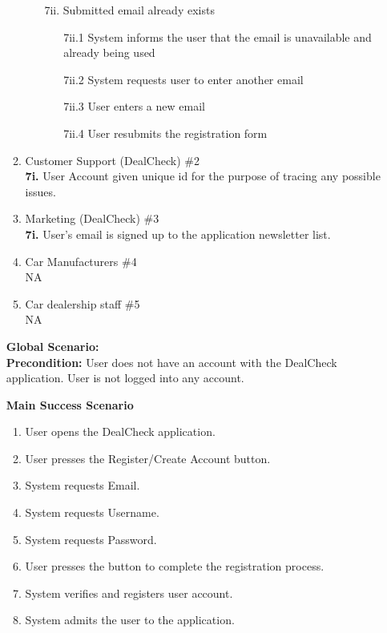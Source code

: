 \documentclass[]{article}
\begin{document}
\begin{enumerate}[{\bf {BE}1.}]
\begin{enumerate}[{\bf VP1.}]
\begin{enumerate}
		\item [7ii.] Submitted email already exists
		\begin{enumerate}
			\item [7ii.1] System informs the user that the email is unavailable and already being used
			\item [7ii.2] System requests user to enter another email
			\item [7ii.3] User enters a new email
			\item [7ii.4] User resubmits the registration form
		\end{enumerate}
	\end{enumerate}

    \item Customer Support (DealCheck) \#2 \\
        \textbf{7i.} User Account given unique id for the purpose of tracing any possible issues.
    \item Marketing (DealCheck) \#3 \\
		\textbf{7i.} User’s email is signed up to the application newsletter list.
    \item Car Manufacturers \#4 \\
        NA
    \item Car dealership staff \#5 \\
        NA
\end{enumerate}
{\bf Global Scenario:}\\
{\bf Precondition:} User does not have an account with the DealCheck application. User is not logged into any account.

{\bf Main Success Scenario}
    \begin{enumerate}[1.]
        \item User opens the DealCheck application.
        \item User presses the Register/Create Account button.
        \item System requests Email.
        \item System requests Username.
        \item System requests Password.
        \item User presses the button to complete the registration process.
        \item System verifies and registers user account.
        \item System admits the user to the application.
    \end{enumerate}
    

\end{enumerate}
\end{document}
